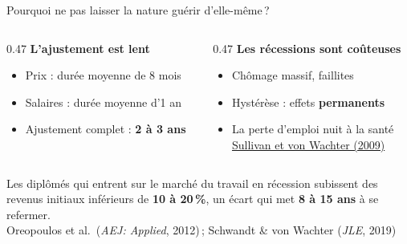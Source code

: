 \documentclass[aspectratio=169]{beamer}
\begin{document}
\begin{frame}[t]{Pourquoi ne pas laisser la nature guérir d'elle-même\,?}\examtag
   \vspace{0.2cm}
   \begin{columns}[T]
      \begin{column}{0.47\textwidth}
         \textbf{\textcolor{HECnavy}{L'ajustement est lent}}
         \vspace{0.15cm}
         \begin{itemize}
            \setlength\itemsep{0.15cm}
            \item Prix : durée moyenne de 8 mois
            \item Salaires : durée moyenne d'1 an
            \item Ajustement complet : \textbf{2 à 3 ans}
         \end{itemize}
      \end{column}
      \begin{column}{0.47\textwidth}
         \textbf{\textcolor{HECcoral}{Les récessions sont coûteuses}}
         \vspace{0.15cm}
         \begin{itemize}
            \setlength\itemsep{0.15cm}
            \item Chômage massif, faillites
            \item Hystérèse : effets \textbf{permanents}
            \item La perte d’emploi nuit à la santé\\[-1pt]
                  \hfill{\scriptsize\textcolor{HECgray}{\href{https://doi.org/10.1162/qjec.2009.124.3.1265}{Sullivan et von Wachter (2009)}}}
         \end{itemize}
      \end{column}
   \end{columns}
   \vspace{0.22cm}
   \begin{keyinsight}
      Les diplômés qui entrent sur le marché du travail en récession subissent des revenus initiaux inférieurs de \textbf{10 à 20\,\%}, un écart qui met \textbf{8 à 15 ans} à se refermer.\\
      \mbox{}\hfill{\scriptsize\textcolor{HECgray}{Oreopoulos et al.\ (\textit{AEJ: Applied}, 2012)\,; Schwandt \& von Wachter (\textit{JLE}, 2019)}}
   \end{keyinsight}
\end{frame}
\end{document}
